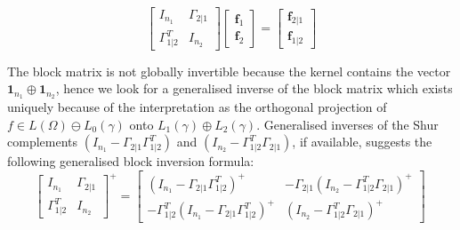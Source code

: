 \documentclass[12pt,a4paper]{amsart}
\begin{document}
\begin{equation}
\label{eq:block}
  \begin{bmatrix}
    I_{n_1} & \Gamma_{2|1} \\ \Gamma_{1|2}^T & I_{n_2}
  \end{bmatrix}
  \begin{bmatrix}
    \bm f_1 \\ \bm f_2
  \end{bmatrix}
=
\begin{bmatrix}
  \bm f_{2|1} \\ \bm f_{1|2}
\end{bmatrix}
\end{equation}

The block matrix is not globally invertible because the kernel contains the vector $\bm 1 _{n_1} \oplus \bm 1_{n_2}$, hence we look for a generalised inverse of the block matrix  which  exists uniquely because of the interpretation as the orthogonal projection of $f \in L(\Omega) \ominus L_0(\gamma)$ onto $L_1(\gamma)\oplus L_2(\gamma)$. Generalised inverses of the Shur complements $(I_{n_1}-\Gamma_{2|1}\Gamma_{1|2}^T)$ and $(I_{n_2}-\Gamma_{1|2}^T\Gamma_{2|1})$, if available, suggests the following generalised block inversion formula:
%
\begin{equation}
\label{eq:blocksolve}
\begin{bmatrix}
    I_{n_1} & \Gamma_{2|1} \\ \Gamma_{1|2}^T & I_{n_2}
  \end{bmatrix} ^+ =
  \begin{bmatrix}
    (I_{n_1}-\Gamma_{2|1}\Gamma_{1|2}^T)^{+} & - \Gamma_{2|1} (I_{n_2}-\Gamma_{1|2}^T\Gamma_{2|1})^{+} \\
 - \Gamma_{1|2}^T (I_{n_1}-\Gamma_{2|1}\Gamma_{1|2}^T)^{+} & (I_{n_2}-\Gamma_{1|2}^T\Gamma_{2|1})^{+} 
\end{bmatrix} \ 
\end{equation}
\end{document}
